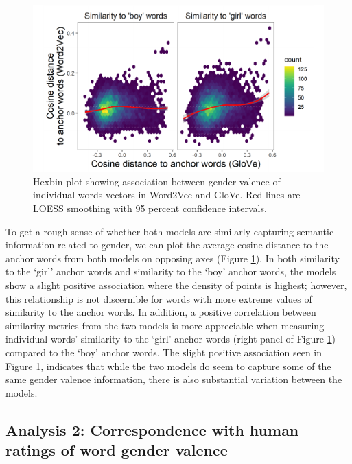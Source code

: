 \documentclass[10pt, letterpaper]{article}
\newenvironment{CodeChunk}{}{}
\begin{document}
\begin{CodeChunk}
\begin{figure}[h]

{\centering \includegraphics{figs/corr_plot-1} 

}

\caption[Hexbin plot showing association between gender valence of individual words vectors in Word2Vec and GloVe]{Hexbin plot showing association between gender valence of individual words vectors in Word2Vec and GloVe. Red lines are LOESS smoothing with 95 percent confidence intervals.}\label{fig:corr_plot}
\end{figure}
\end{CodeChunk}

To get a rough sense of whether both models are similarly capturing
semantic information related to gender, we can plot the average cosine
distance to the anchor words from both models on opposing axes (Figure
\ref{fig:corr_plot}). In both similarity to the `girl' anchor words and
similarity to the `boy' anchor words, the models show a slight positive
association where the density of points is highest; however, this
relationship is not discernible for words with more extreme values of
similarity to the anchor words. In addition, a positive correlation
between similarity metrics from the two models is more appreciable when
measuring individual words' similarity to the `girl' anchor words (right
panel of Figure \ref{fig:corr_plot}) compared to the `boy' anchor words.
The slight positive association seen in Figure \ref{fig:corr_plot},
indicates that while the two models do seem to capture some of the same
gender valence information, there is also substantial variation between
the models.

\hypertarget{analysis-2-correspondence-with-human-ratings-of-word-gender-valence}{%
\subsection{Analysis 2: Correspondence with human ratings of word gender
valence}\label{analysis-2-correspondence-with-human-ratings-of-word-gender-valence}}
\end{document}
